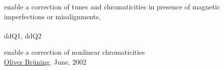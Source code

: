 enable a correction of tunes and chromaticities in presence of magnetic imperfections or misalignments,
\\\\ddQ1, ddQ2

enable a correction of nonlinear chromaticities
%
%
% 
%
\\
\href{http://bruening.home.cern.ch/bruening/}{Oliver Br\"uning},
June, 2002

